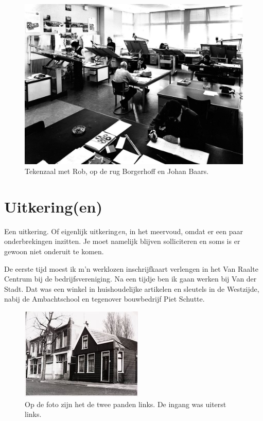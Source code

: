 \documentclass[10pt,twoside, openright]{memoir}
\begin{document}
\begin{figure}[t]
\includegraphics[width=\textwidth]{img/ch40/tekenz}
\caption*{\footnotesize Tekenzaal met Rob, op de rug Borgerhoff en Johan Baars.}
\end{figure}

\chapter{Uitkering(en)} %
\label{cha:uitkering_en}

Een uitkering. Of eigenlijk uitkering\emph{en}, in het meervoud, omdat er een paar onderbrekingen inzitten. Je moet namelijk blijven solliciteren en soms is er gewoon niet onderuit te komen. 

De eerste tijd moest ik m'n werklozen inschrijfkaart verlengen in het Van Raalte Centrum bij de bedrijfsvereniging. Na een tijdje ben ik gaan werken bij Van der Stadt. Dat was een winkel in huishoudelijke artikelen en sleutels in de Westzijde, nabij de Ambachtschool en tegenover bouwbedrijf Piet Schutte.

\begin{figure}
\includegraphics[width=\textwidth]{img/ch41/stadt}
\caption*{\footnotesize Op de foto zijn het de twee panden links. De ingang was uiterst links.}
\end{figure}
\end{document}
